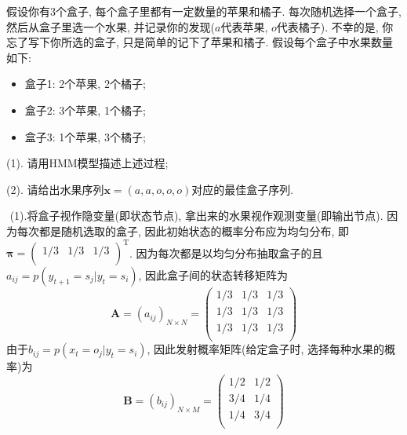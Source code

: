 \documentclass{article}
\begin{document}
\begin{homeworkProblem}
	假设你有3个盒子, 每个盒子里都有一定数量的苹果和橘子. 每次随机选择一个盒子, 然后从盒子里选一个水果, 并记录你的发现($a$代表苹果, $o$代表橘子). 不幸的是, 你忘了写下你所选的盒子, 只是简单的记下了苹果和橘子. 假设每个盒子中水果数量如下:
	\begin{itemize}
		\item 盒子1: 2个苹果, 2个橘子;
		\item 盒子2: 3个苹果, 1个橘子;
		\item 盒子3: 1个苹果, 3个橘子;
	\end{itemize}
	
	(1). 请用HMM模型描述上述过程;

	(2). 请给出水果序列$\boldsymbol{x}=\left( a,a,o,o,o \right) $对应的最佳盒子序列.

	\solution \,\,(1).将盒子视作隐变量(即状态节点), 拿出来的水果视作观测变量(即输出节点). 因为每次都是随机选取的盒子, 因此初始状态的概率分布应为均匀分布, 即$\boldsymbol{\pi }=\left( \begin{matrix}
		1/3&		1/3&		1/3\\
	\end{matrix} \right) ^{\text{T}}$. 因为每次都是以均匀分布抽取盒子的且$a_{ij}=p\left( y_{t+1}=s_j|y_t=s_i \right) $, 因此盒子间的状态转移矩阵为$$\boldsymbol{A}=\left( a_{ij} \right) _{N\times N}=\left( \begin{matrix}
		1/3&		1/3&		1/3\\
		1/3&		1/3&		1/3\\
		1/3&		1/3&		1/3\\
	\end{matrix} \right)$$
	由于$b_{ij}=p\left( x_t=o_j|y_t=s_i \right)$, 因此发射概率矩阵(给定盒子时, 选择每种水果的概率)为$$\boldsymbol{B}=\left( b_{ij} \right) _{N\times M}=\left( \begin{matrix}
		1/2&		1/2\\
		3/4&		1/4\\
		1/4&		3/4\\
	\end{matrix} \right) $$


\end{homeworkProblem}
\end{document}
